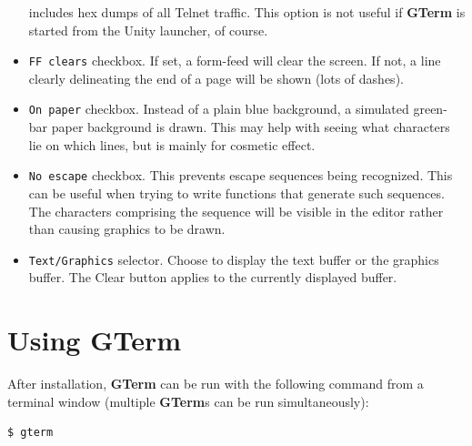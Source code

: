 \documentclass[a4paper,twoside,11pt]{article}
\begin{document}
\begin{itemize}
      includes hex dumps of all Telnet traffic. This option is not useful if \textbf{GTerm} is started from the Unity launcher, of course.
\item \texttt{FF clears} checkbox. If set, a form-feed will clear the screen. If not, a line clearly delineating the end of a
      page will be shown (lots of dashes).
\item \texttt{On paper} checkbox. Instead of a plain blue background, a simulated green-bar paper background is drawn. This may
      help with seeing what characters lie on which lines, but is mainly for cosmetic effect.
\item \texttt{No escape} checkbox. This prevents escape sequences being recognized. This can be useful when trying to
	write functions that generate such sequences. The characters comprising the sequence will be visible in the editor rather than
	causing graphics to be drawn.
\item \texttt{Text/Graphics} selector. Choose to display the text buffer or the graphics buffer. The Clear button applies to the
      currently displayed buffer.
\end{itemize} 

\section{Using \textbf{GTerm}}
After installation, \textbf{GTerm} can be run with the following command from a terminal window (multiple \textbf{GTerm}s
can be run simultaneously):
\begin{lstlisting}
$ gterm
\end{lstlisting}
\end{document}
